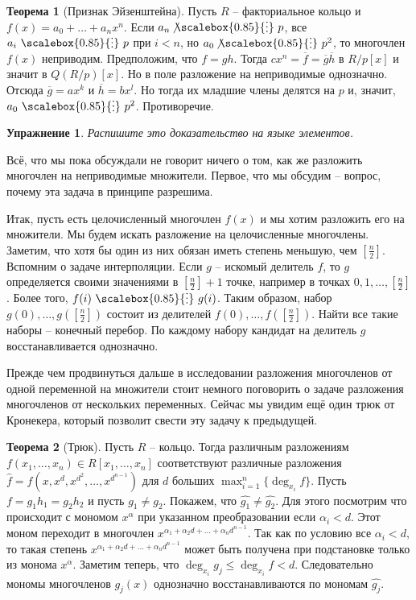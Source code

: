 \documentclass[12pt,a4paper,oneside]{book}
\newtheorem{uprz}{\color{violet!100!black} Упражнение}
\theoremstyle{definition}
\newtheorem{thm}{\color{red!40!black}Теорема}
\renewcommand{\leq}{\leqslant}
\newcommand{\ovl}{\overline}
\newcommand{\di}{\mathop{\,\scalebox{0.85}{\raisebox{-1.2pt}[0.5\height]{\vdots}}\,}}
\newcommand{\ndi}{\mathop{\not\scalebox{0.85}{\raisebox{-1.2pt}[0.5\height]{\vdots}}\,}}
\def\thrm{\begin{thm}}
\def\ethrm{\end{thm}}
\def\upr{\begin{uprz}}
\def\eupr{\end{uprz}}
\begin{document}
\thrm[Признак Эйзенштейна] Пусть $R$ -- факториальное кольцо и $f(x)= a_0 + \dots + a_n x^n$. Если $a_n \ndi p$, все $a_i \di p$ при $i<n$, но $a_0\ndi p^2$, то многочлен $f(x)$ неприводим.
\proof
Предположим, что $f=gh$. Тогда $c x^n=\ovl{f}=\ovl{g}\ovl{h}$ в $R/p[x]$ и значит в $Q(R/p)[x]$. Но в поле разложение на неприводимые однозначно. Отсюда $\ovl{g}=ax^k$ и $\ovl{h}=b x^l$. Но тогда их младшие члены делятся на $p$ и, значит, $a_0\di p^2$. Противоречие. 
\endproof
\ethrm 

\upr Распишите это доказательство на языке элементов.
\eupr

Всё, что мы пока обсуждали не говорит ничего о том, как же разложить многочлен на неприводимые множители. Первое, что мы обсудим -- вопрос, почему эта задача в принципе разрешима.

Итак, пусть есть целочисленный многочлен $f(x)$ и мы хотим разложить его на множители. Мы будем искать разложение на целочисленные многочлены. Заметим, что хотя бы один из них обязан иметь степень меньшую, чем $[\frac{n}{2}]$. Вспомним о задаче интерполяции. Если $g$ -- искомый делитель $f$, то $g$ определяется своими значениями в $[\frac{n}{2}]+1$ точке, например в точках $0,1,\dots, [\frac{n}{2}]$. Более того, $f(i) \di g(i)$. Таким образом, набор $g(0),\dots, g([\frac{n}{2}])$ состоит из делителей $f(0),\dots,f([\frac{n}{2}])$. Найти все такие наборы -- конечный перебор. По каждому набору кандидат на делитель $g$ восстанавливается однозначно.

Прежде чем продвинуться дальше в исследовании разложения многочленов от одной переменной на множители стоит немного поговорить о задаче разложения многочленов от нескольких переменных. Сейчас мы увидим ещё один трюк от Кронекера, который позволит свести эту задачу к предыдущей.

\thrm[Трюк] Пусть $R$ -- кольцо. Тогда различным разложениям $f(x_1,\dots,x_n)\in R[x_1,\dots,x_n]$   соответствуют различные разложения $\hat{f}=f(x, x^d, x^{d^2}, \dots, x^{d^{n-1}})$ для $d$ больших $\max_{i=1}^n \{\deg_{x_i} f\}$.
\proof Пусть $f=g_1h_1=g_2h_2$ и пусть $g_1\neq g_2$. Покажем, что $\hat{g_1}\neq \hat{g_2}$. Для этого посмотрим что происходит с мономом $x^{\alpha}$ при указанном преобразовании если $\alpha_i < d$. Этот моном переходит в многочлен $x^{\alpha_1+\alpha_2d+\dots+\alpha_n d^{n-1}}$. Так как по условию все $\alpha_i<d$, то такая степень  $x^{\alpha_1+\alpha_2d+\dots+\alpha_n d^{n-1}}$ может быть получена при подстановке только из монома $x^{\alpha}$. Заметим теперь, что $\deg_{x_i} g_j \leq \deg_{x_i} f <d$. Следовательно мономы многочленов $g_j(x)$ однозначно восстанавливаются по мономам $\hat{g_j}$.
\endproof
\ethrm
\end{document}
